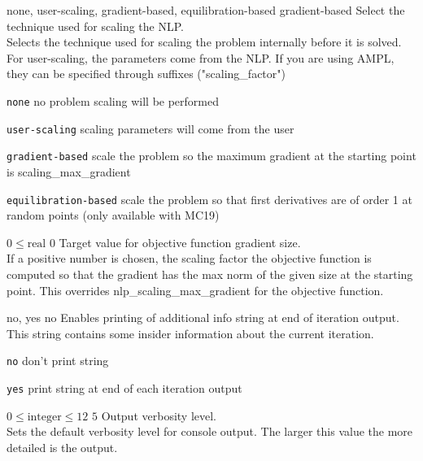 %
{none, user-scaling, gradient-based, equilibration-based}%
{gradient-based}%
{Select the technique used for scaling the NLP.\\
Selects the technique used for scaling the problem internally before it is solved. For user-scaling, the parameters come from the NLP. If you are using AMPL, they can be specified through suffixes ("scaling\_factor")}%
{\begin{list}{}{
\setlength{\parsep}{0em}
\setlength{\leftmargin}{5ex}
\setlength{\labelwidth}{2ex}
\setlength{\itemindent}{0ex}
\setlength{\topsep}{0pt}}
\item[\texttt{none}] no problem scaling will be performed
\item[\texttt{user-scaling}] scaling parameters will come from the user
\item[\texttt{gradient-based}] scale the problem so the maximum gradient at the starting point is scaling\_max\_gradient
\item[\texttt{equilibration-based}] scale the problem so that first derivatives are of order 1 at random points (only available with MC19)
\end{list}
}

%
{$0\leq\textrm{real}$}%
{$0$}%
{Target value for objective function gradient size.\\
If a positive number is chosen, the scaling factor the objective function is computed so that the gradient has the max norm of the given size at the starting point.  This overrides nlp\_scaling\_max\_gradient for the objective function.}%
{}

%
{no, yes}%
{no}%
{Enables printing of additional info string at end of iteration output.\\
This string contains some insider information about the current iteration.}%
{\begin{list}{}{
\setlength{\parsep}{0em}
\setlength{\leftmargin}{5ex}
\setlength{\labelwidth}{2ex}
\setlength{\itemindent}{0ex}
\setlength{\topsep}{0pt}}
\item[\texttt{no}] don't print string
\item[\texttt{yes}] print string at end of each iteration output
\end{list}
}

%
{$0\leq\textrm{integer}\leq12$}%
{$5$}%
{Output verbosity level.\\
Sets the default verbosity level for console output. The larger this value the more detailed is the output.}%
{}

